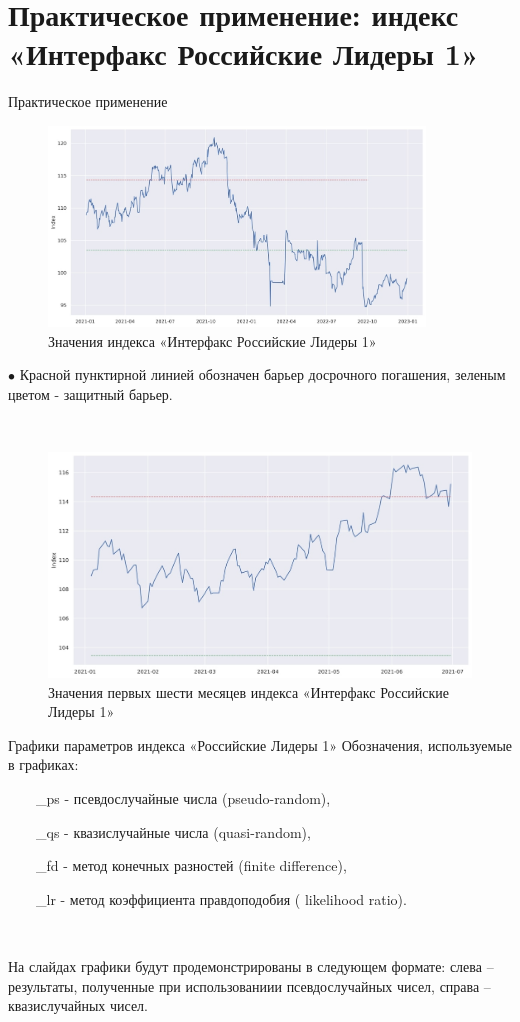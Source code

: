 \documentclass[aspectratio=169]{beamer}
\begin{document}
    \section{Практическое применение: индекс «Интерфакс Российские Лидеры 1»}
    \begin{frame}{Практическое применение}
        \begin{figure}[h!]
\includegraphics[width=10cm]{01.jpg} \\ Значения индекса «Интерфакс Российские Лидеры 1»
\end{figure}
 $\bullet$ Красной пунктирной линией обозначен барьер досрочного погашения, зеленым цветом - защитный барьер.

    \end{frame} 

\begin{figure}
\centering
\ \ \ \ 

\includegraphics[width=13cm]{02.jpg} \\ Значения первых шести месяцев индекса  «Интерфакс Российские Лидеры 1»

\end{figure}

 \begin{frame}{Графики параметров индекса «Российские Лидеры 1»}
Обозначения, используемые в графиках:

 \ \ \ \ \_ps - псевдослучайные числа (pseudo-random),

 \ \ \ \ \_qs - квазислучайные числа (quasi-random),

 \ \ \ \ \_fd - метод конечных разностей (finite difference),

 \ \ \ \ \_lr - метод коэффициента правдоподобия ( likelihood ratio).
 
\

На слайдах графики будут продемонстрированы в следующем формате: слева -- результаты, полученные при использованиии псевдослучайных чисел, справа -- квазислучайных чисел.
\end{frame} 
\end{document}

